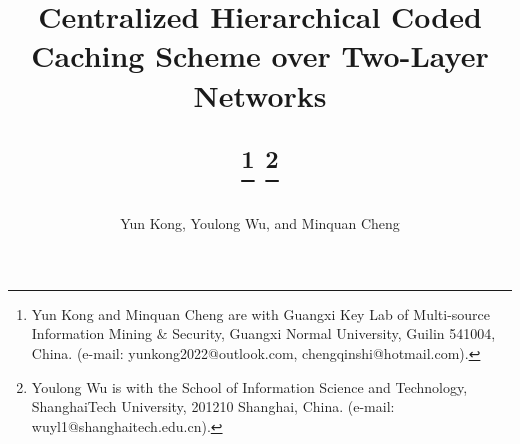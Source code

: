\documentclass[onecolumn,10pt]{IEEEtran}
\theoremstyle{mythm}
\begin{document}
\title{Centralized Hierarchical Coded Caching Scheme
over Two-Layer Networks
\author{Yun Kong, Youlong Wu, and Minquan Cheng}
\thanks{Yun Kong and Minquan Cheng are with Guangxi Key Lab of Multi-source Information Mining $\&$ Security, Guangxi Normal University,
Guilin 541004, China.  (e-mail: yunkong2022@outlook.com, chengqinshi@hotmail.com). }
\thanks{Youlong Wu is with the School of Information Science and Technology, ShanghaiTech University,
201210 Shanghai, China. (e-mail: wuyl1@shanghaitech.edu.cn).}
}
\maketitle
%
\end{document}
